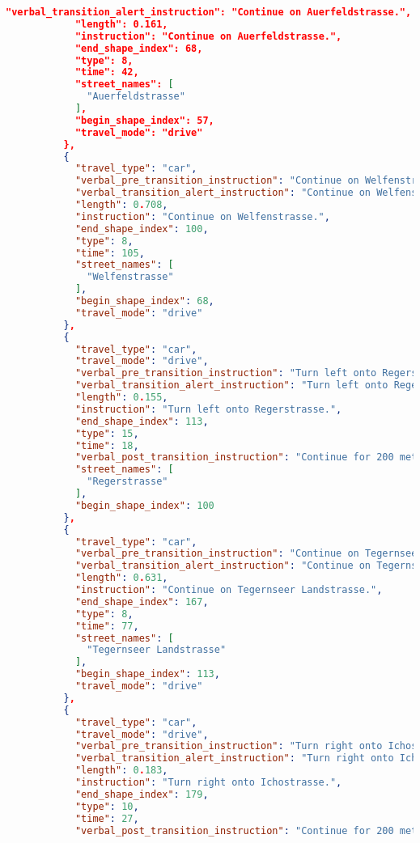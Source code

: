 \begin{lstlisting}[language=json,breaklines=true]
            "verbal_transition_alert_instruction": "Continue on Auerfeldstrasse.",
            "length": 0.161,
            "instruction": "Continue on Auerfeldstrasse.",
            "end_shape_index": 68,
            "type": 8,
            "time": 42,
            "street_names": [
              "Auerfeldstrasse"
            ],
            "begin_shape_index": 57,
            "travel_mode": "drive"
          },
          {
            "travel_type": "car",
            "verbal_pre_transition_instruction": "Continue on Welfenstrasse for 700 meters.",
            "verbal_transition_alert_instruction": "Continue on Welfenstrasse.",
            "length": 0.708,
            "instruction": "Continue on Welfenstrasse.",
            "end_shape_index": 100,
            "type": 8,
            "time": 105,
            "street_names": [
              "Welfenstrasse"
            ],
            "begin_shape_index": 68,
            "travel_mode": "drive"
          },
          {
            "travel_type": "car",
            "travel_mode": "drive",
            "verbal_pre_transition_instruction": "Turn left onto Regerstrasse.",
            "verbal_transition_alert_instruction": "Turn left onto Regerstrasse.",
            "length": 0.155,
            "instruction": "Turn left onto Regerstrasse.",
            "end_shape_index": 113,
            "type": 15,
            "time": 18,
            "verbal_post_transition_instruction": "Continue for 200 meters.",
            "street_names": [
              "Regerstrasse"
            ],
            "begin_shape_index": 100
          },
          {
            "travel_type": "car",
            "verbal_pre_transition_instruction": "Continue on Tegernseer Landstrasse for 600 meters.",
            "verbal_transition_alert_instruction": "Continue on Tegernseer Landstrasse.",
            "length": 0.631,
            "instruction": "Continue on Tegernseer Landstrasse.",
            "end_shape_index": 167,
            "type": 8,
            "time": 77,
            "street_names": [
              "Tegernseer Landstrasse"
            ],
            "begin_shape_index": 113,
            "travel_mode": "drive"
          },
          {
            "travel_type": "car",
            "travel_mode": "drive",
            "verbal_pre_transition_instruction": "Turn right onto Ichostrasse.",
            "verbal_transition_alert_instruction": "Turn right onto Ichostrasse.",
            "length": 0.183,
            "instruction": "Turn right onto Ichostrasse.",
            "end_shape_index": 179,
            "type": 10,
            "time": 27,
            "verbal_post_transition_instruction": "Continue for 200 meters.",

\end{lstlisting}
